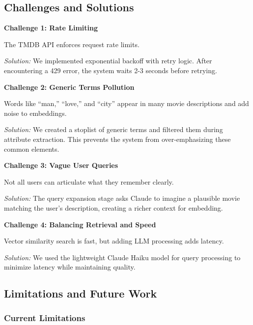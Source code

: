 \documentclass[11pt,a4paper]{article}
\begin{document}
\subsection{Challenges and Solutions}

\textbf{Challenge 1: Rate Limiting}

The TMDB API enforces request rate limits. 

\textit{Solution:} We implemented exponential backoff with retry logic. After encountering a 429 error, the system waits 2-3 seconds before retrying.

\textbf{Challenge 2: Generic Terms Pollution}

Words like ``man,'' ``love,'' and ``city'' appear in many movie descriptions and add noise to embeddings.

\textit{Solution:} We created a stoplist of generic terms and filtered them during attribute extraction. This prevents the system from over-emphasizing these common elements.

\textbf{Challenge 3: Vague User Queries}

Not all users can articulate what they remember clearly.

\textit{Solution:} The query expansion stage asks Claude to imagine a plausible movie matching the user's description, creating a richer context for embedding.

\textbf{Challenge 4: Balancing Retrieval and Speed}

Vector similarity search is fast, but adding LLM processing adds latency.

\textit{Solution:} We used the lightweight Claude Haiku model for query processing to minimize latency while maintaining quality.

\subsection{Limitations and Future Work}

\subsubsection{Current Limitations}
\end{document}
